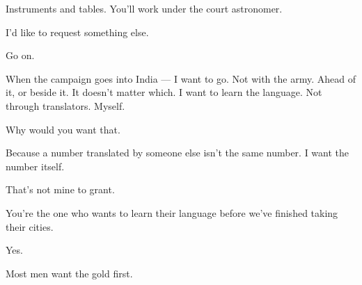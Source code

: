 \begin{dialogue}
Instruments and tables. You'll work under the court astronomer.\\
\end{dialogue}
\begin{dialogue}
I'd like to request something else.\\
\end{dialogue}
\begin{dialogue}
Go on.\\
\end{dialogue}
\begin{dialogue}
When the campaign goes into India --- I want to go. Not with the army. Ahead of it, or beside it. It doesn't matter which. I want to learn the language. Not through translators. Myself.\\
\end{dialogue}
\begin{dialogue}
Why would you want that.\\
\end{dialogue}
\begin{dialogue}
Because a number translated by someone else isn't the same number. I want the number itself.\\
\end{dialogue}
\begin{dialogue}
That's not mine to grant.\\
\end{dialogue}
\begin{dialogue}
You're the one who wants to learn their language before we've finished taking their cities.\\
\end{dialogue}
\begin{dialogue}
Yes.\\
\end{dialogue}
\begin{dialogue}
Most men want the gold first.\\
\end{dialogue}

